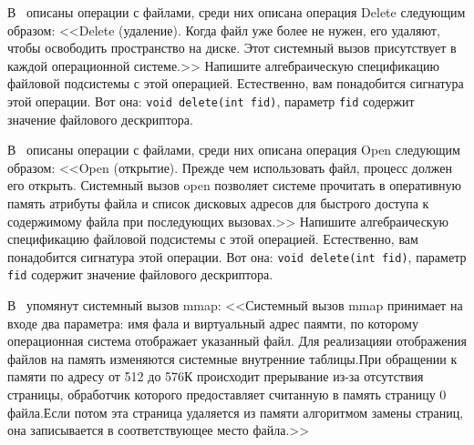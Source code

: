\z В~\cite{tanenbaum_os} описаны операции с файлами, среди них описана операция Delete следующим образом: <<\textsf{Delete} (удаление). Когда файл уже более не нужен, его удаляют, чтобы освободить пространство на диске. Этот системный вызов присутствует в каждой операционной системе.>> Напишите алгебраическую спецификацию файловой подсистемы с этой операцией. Естественно, вам понадобится сигнатура этой операции. Вот она:  \texttt{void delete(int fid)}, параметр \texttt{fid} содержит значение файлового дескриптора.

\z В~\cite{tanenbaum_os} описаны операции с файлами, среди них описана операция Open следующим образом: <<\textsf{Open} (открытие). Прежде чем использовать файл, процесс должен его открыть. Системный вызов open позволяет системе прочитать в оперативную память атрибуты файла и список дисковых адресов для быстрого доступа к содержимому файла при последующих вызовах.>> Напишите алгебраическую спецификацию файловой подсистемы с этой операцией. Естественно, вам понадобится сигнатура этой операции. Вот она:  \texttt{void delete(int fid)}, параметр \texttt{fid} содержит значение файлового дескриптора.

\z В~\cite{tanenbaum_os} упомянут системный вызов mmap: <<Системный вызов mmap принимает на входе два параметра: имя фала и виртуальный адрес паямти, по которому операционная система отображает указанный файл. Для реализацияи отображения файлов на память изменяются системные внутренние таблицы.При обращении к памяти по адресу от 512 до 576К происходит прерывание из-за отсутствия страницы, обработчик которого предоставляет считанную в память страницу 0 файла.Если потом эта страница удаляется из памяти алгоритмом замены страниц, она записывается в соответствующее место файла.>>


%
%

